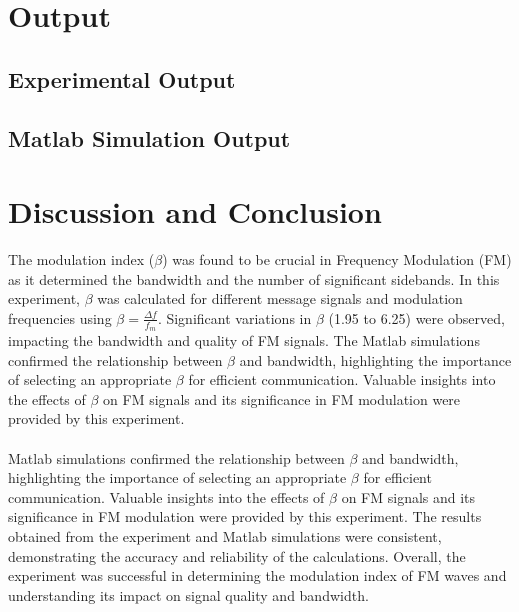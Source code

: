\documentclass[12pt]{article}
\begin{document}
\inputminted[linenos,breaklines,breakanywhere]{matlab}{./assets/fm.m}

\section*{Output}

\subsection*{Experimental Output}


\subsection*{Matlab Simulation Output}
% 

\section*{Discussion and Conclusion}
The modulation index (\( \beta \)) was found to be crucial in Frequency Modulation (FM) as it determined the bandwidth and the number of significant sidebands. In this experiment, \( \beta \) was calculated for different message signals and modulation frequencies using \( \beta = \frac{\Delta f}{f_m} \). Significant variations in \( \beta \) (1.95 to 6.25) were observed, impacting the bandwidth and quality of FM signals. The Matlab simulations confirmed the relationship between \( \beta \) and bandwidth, highlighting the importance of selecting an appropriate \( \beta \) for efficient communication. Valuable insights into the effects of \( \beta \) on FM signals and its significance in FM modulation were provided by this experiment.
\\\\
Matlab simulations confirmed the relationship between \( \beta \) and bandwidth, highlighting the importance of selecting an appropriate \( \beta \) for efficient communication. Valuable insights into the effects of \( \beta \) on FM signals and its significance in FM modulation were provided by this experiment. The results obtained from the experiment and Matlab simulations were consistent, demonstrating the accuracy and reliability of the calculations. Overall, the experiment was successful in determining the modulation index of FM waves and understanding its impact on signal quality and bandwidth.


\renewcommand{\bibname}{References}

\end{document}
